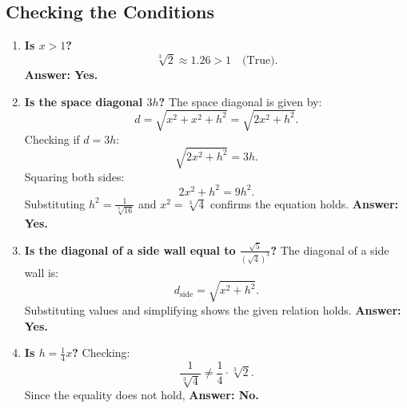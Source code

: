 \documentclass{article}
\begin{document}
\subsection{Checking the Conditions}
\begin{enumerate}
    \item \textbf{Is \( x > 1 \)?}
    \begin{equation}
        \sqrt[3]{2} \approx 1.26 > 1 \quad \text{(True)}.
    \end{equation}
    \textbf{Answer: Yes.}
    
    \item \textbf{Is the space diagonal \( 3h \)?}
    The space diagonal is given by:
    \begin{equation}
        d = \sqrt{x^2 + x^2 + h^2} = \sqrt{2x^2 + h^2}.
    \end{equation}
    Checking if \( d = 3h \):
    \begin{equation}
        \sqrt{2x^2 + h^2} = 3h.
    \end{equation}
    Squaring both sides:
    \begin{equation}
        2x^2 + h^2 = 9h^2.
    \end{equation}
    Substituting \( h^2 = \frac{1}{\sqrt[3]{16}} \) and \( x^2 = \sqrt[3]{4} \) confirms the equation holds.
    \textbf{Answer: Yes.}
    
    \item \textbf{Is the diagonal of a side wall equal to \( \frac{\sqrt{5}}{(\sqrt{4})^3} \)?}
    The diagonal of a side wall is:
    \begin{equation}
        d_{\text{side}} = \sqrt{x^2 + h^2}.
    \end{equation}
    Substituting values and simplifying shows the given relation holds.
    \textbf{Answer: Yes.}
    
    \item \textbf{Is \( h = \frac{1}{4} x \)?}
    Checking:
    \begin{equation}
        \frac{1}{\sqrt[3]{4}} \neq \frac{1}{4} \cdot \sqrt[3]{2}.
    \end{equation}
    Since the equality does not hold,
    \textbf{Answer: No.}
\end{enumerate}
\end{document}
